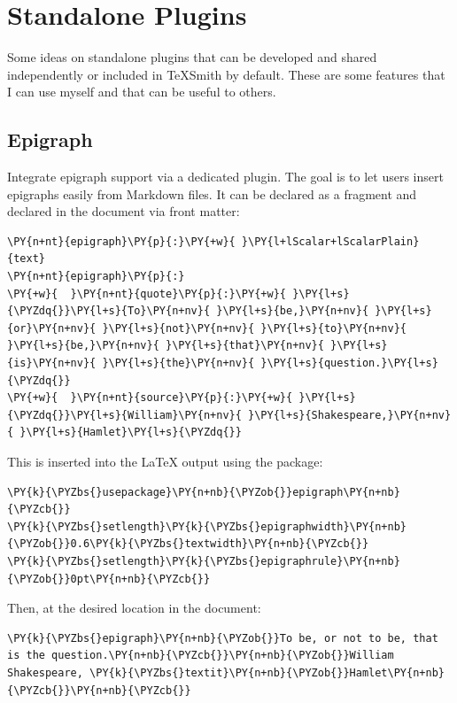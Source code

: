 \documentclass[a4paper,twoside]{article}
\begin{document}
\section{Standalone Plugins}
Some ideas on standalone plugins that can be developed and shared independently or included in TeXSmith by default. These are some features that I can use myself and that can be useful to others.
\subsection{Epigraph}
Integrate epigraph support via a dedicated plugin. The goal is to let users insert epigraphs easily from Markdown files. It can be declared as a fragment and declared in the document via front matter:
\begin{tscode}[lang=yaml, engine=pygments]
\begin{Verbatim}[commandchars=\\\{\},breaklines, breakanywhere, commandchars=\\\{\}]
\PY{n+nt}{epigraph}\PY{p}{:}\PY{+w}{ }\PY{l+lScalar+lScalarPlain}{text}
\PY{n+nt}{epigraph}\PY{p}{:}
\PY{+w}{  }\PY{n+nt}{quote}\PY{p}{:}\PY{+w}{ }\PY{l+s}{\PYZdq{}}\PY{l+s}{To}\PY{n+nv}{ }\PY{l+s}{be,}\PY{n+nv}{ }\PY{l+s}{or}\PY{n+nv}{ }\PY{l+s}{not}\PY{n+nv}{ }\PY{l+s}{to}\PY{n+nv}{ }\PY{l+s}{be,}\PY{n+nv}{ }\PY{l+s}{that}\PY{n+nv}{ }\PY{l+s}{is}\PY{n+nv}{ }\PY{l+s}{the}\PY{n+nv}{ }\PY{l+s}{question.}\PY{l+s}{\PYZdq{}}
\PY{+w}{  }\PY{n+nt}{source}\PY{p}{:}\PY{+w}{ }\PY{l+s}{\PYZdq{}}\PY{l+s}{William}\PY{n+nv}{ }\PY{l+s}{Shakespeare,}\PY{n+nv}{ }\PY{l+s}{Hamlet}\PY{l+s}{\PYZdq{}}
\end{Verbatim}
\end{tscode}
This is inserted into the \LaTeX{} output using the  package:
\begin{tscode}[lang=latex, engine=pygments]
\begin{Verbatim}[commandchars=\\\{\},breaklines, breakanywhere, commandchars=\\\{\}]
\PY{k}{\PYZbs{}usepackage}\PY{n+nb}{\PYZob{}}epigraph\PY{n+nb}{\PYZcb{}}
\PY{k}{\PYZbs{}setlength}\PY{k}{\PYZbs{}epigraphwidth}\PY{n+nb}{\PYZob{}}0.6\PY{k}{\PYZbs{}textwidth}\PY{n+nb}{\PYZcb{}}
\PY{k}{\PYZbs{}setlength}\PY{k}{\PYZbs{}epigraphrule}\PY{n+nb}{\PYZob{}}0pt\PY{n+nb}{\PYZcb{}}
\end{Verbatim}
\end{tscode}
Then, at the desired location in the document:
\begin{tscode}[lang=latex, engine=pygments]
\begin{Verbatim}[commandchars=\\\{\},breaklines, breakanywhere, commandchars=\\\{\}]
\PY{k}{\PYZbs{}epigraph}\PY{n+nb}{\PYZob{}}To be, or not to be, that is the question.\PY{n+nb}{\PYZcb{}}\PY{n+nb}{\PYZob{}}William Shakespeare, \PY{k}{\PYZbs{}textit}\PY{n+nb}{\PYZob{}}Hamlet\PY{n+nb}{\PYZcb{}}\PY{n+nb}{\PYZcb{}}
\end{Verbatim}
\end{tscode}
\end{document}
